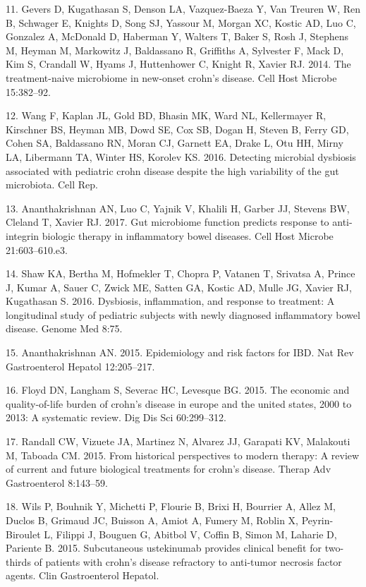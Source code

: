 \documentclass[12pt,]{article}
\begin{document}
\hypertarget{ref-gevers_pedsCD_2014}{}
11. Gevers D, Kugathasan S, Denson LA, Vazquez-Baeza Y, Van Treuren W,
Ren B, Schwager E, Knights D, Song SJ, Yassour M, Morgan XC, Kostic AD,
Luo C, Gonzalez A, McDonald D, Haberman Y, Walters T, Baker S, Rosh J,
Stephens M, Heyman M, Markowitz J, Baldassano R, Griffiths A, Sylvester
F, Mack D, Kim S, Crandall W, Hyams J, Huttenhower C, Knight R, Xavier
RJ. 2014. The treatment-naive microbiome in new-onset crohn's disease.
Cell Host Microbe 15:382--92.

\hypertarget{ref-wang_pedsCD_2016}{}
12. Wang F, Kaplan JL, Gold BD, Bhasin MK, Ward NL, Kellermayer R,
Kirschner BS, Heyman MB, Dowd SE, Cox SB, Dogan H, Steven B, Ferry GD,
Cohen SA, Baldassano RN, Moran CJ, Garnett EA, Drake L, Otu HH, Mirny
LA, Libermann TA, Winter HS, Korolev KS. 2016. Detecting microbial
dysbiosis associated with pediatric crohn disease despite the high
variability of the gut microbiota. Cell Rep.

\hypertarget{ref-Ananthakrishnan_IBD_2017}{}
13. Ananthakrishnan AN, Luo C, Yajnik V, Khalili H, Garber JJ, Stevens
BW, Cleland T, Xavier RJ. 2017. Gut microbiome function predicts
response to anti-integrin biologic therapy in inflammatory bowel
diseases. Cell Host Microbe 21:603--610.e3.

\hypertarget{ref-Shaw_response_2016}{}
14. Shaw KA, Bertha M, Hofmekler T, Chopra P, Vatanen T, Srivatsa A,
Prince J, Kumar A, Sauer C, Zwick ME, Satten GA, Kostic AD, Mulle JG,
Xavier RJ, Kugathasan S. 2016. Dysbiosis, inflammation, and response to
treatment: A longitudinal study of pediatric subjects with newly
diagnosed inflammatory bowel disease. Genome Med 8:75.

\hypertarget{ref-ananthakrishnan_epidemiology_2015}{}
15. Ananthakrishnan AN. 2015. Epidemiology and risk factors for IBD. Nat
Rev Gastroenterol Hepatol 12:205--217.

\hypertarget{ref-floyd_economicburden_2015}{}
16. Floyd DN, Langham S, Severac HC, Levesque BG. 2015. The economic and
quality-of-life burden of crohn's disease in europe and the united
states, 2000 to 2013: A systematic review. Dig Dis Sci 60:299--312.

\hypertarget{ref-randall_CDbiologics_2015}{}
17. Randall CW, Vizuete JA, Martinez N, Alvarez JJ, Garapati KV,
Malakouti M, Taboada CM. 2015. From historical perspectives to modern
therapy: A review of current and future biological treatments for
crohn's disease. Therap Adv Gastroenterol 8:143--59.

\hypertarget{ref-wils_ust_2015}{}
18. Wils P, Bouhnik Y, Michetti P, Flourie B, Brixi H, Bourrier A, Allez
M, Duclos B, Grimaud JC, Buisson A, Amiot A, Fumery M, Roblin X,
Peyrin-Biroulet L, Filippi J, Bouguen G, Abitbol V, Coffin B, Simon M,
Laharie D, Pariente B. 2015. Subcutaneous ustekinumab provides clinical
benefit for two-thirds of patients with crohn's disease refractory to
anti-tumor necrosis factor agents. Clin Gastroenterol Hepatol.
\end{document}
